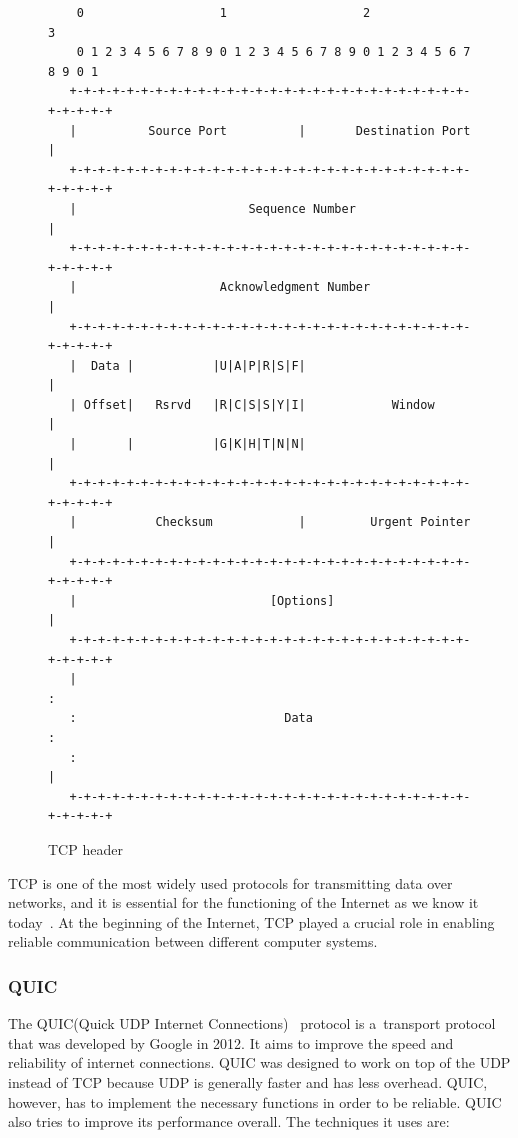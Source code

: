\documentclass[
  printed,     %
  color,       %
  oneside,     %
  nosansbold,  %
  nocolorbold, %
  nolof,         %
  nolot,         %
]{fithesis4}
\begin{document}
\begin{figure}[h]
\fontsize{10pt}{10pt}\selectfont
\begin{center}
\begin{BVerbatim}
    0                   1                   2                   3
    0 1 2 3 4 5 6 7 8 9 0 1 2 3 4 5 6 7 8 9 0 1 2 3 4 5 6 7 8 9 0 1
   +-+-+-+-+-+-+-+-+-+-+-+-+-+-+-+-+-+-+-+-+-+-+-+-+-+-+-+-+-+-+-+-+
   |          Source Port          |       Destination Port        |
   +-+-+-+-+-+-+-+-+-+-+-+-+-+-+-+-+-+-+-+-+-+-+-+-+-+-+-+-+-+-+-+-+
   |                        Sequence Number                        |
   +-+-+-+-+-+-+-+-+-+-+-+-+-+-+-+-+-+-+-+-+-+-+-+-+-+-+-+-+-+-+-+-+
   |                    Acknowledgment Number                      |
   +-+-+-+-+-+-+-+-+-+-+-+-+-+-+-+-+-+-+-+-+-+-+-+-+-+-+-+-+-+-+-+-+
   |  Data |           |U|A|P|R|S|F|                               |
   | Offset|   Rsrvd   |R|C|S|S|Y|I|            Window             |
   |       |           |G|K|H|T|N|N|                               |
   +-+-+-+-+-+-+-+-+-+-+-+-+-+-+-+-+-+-+-+-+-+-+-+-+-+-+-+-+-+-+-+-+
   |           Checksum            |         Urgent Pointer        |
   +-+-+-+-+-+-+-+-+-+-+-+-+-+-+-+-+-+-+-+-+-+-+-+-+-+-+-+-+-+-+-+-+
   |                           [Options]                           |
   +-+-+-+-+-+-+-+-+-+-+-+-+-+-+-+-+-+-+-+-+-+-+-+-+-+-+-+-+-+-+-+-+
   |                                                               :
   :                             Data                              :
   :                                                               |
   +-+-+-+-+-+-+-+-+-+-+-+-+-+-+-+-+-+-+-+-+-+-+-+-+-+-+-+-+-+-+-+-+
\end{BVerbatim}
\end{center}
  \caption{TCP header~\cite{RFC0793}}
  \label{fig:tcp}
\end{figure}

TCP is one of the most widely used protocols for transmitting data over networks, and it is essential for the functioning of the Internet as we know it today~\cite{10.5555/2584507}. At the beginning of the Internet, TCP played a crucial role in enabling reliable communication between different computer systems.

\subsubsection{QUIC}

The QUIC(Quick UDP Internet Connections)~\cite{RFC9000} protocol is a~transport protocol that was developed by Google in 2012. It aims to improve the speed and reliability of internet connections. QUIC was designed to work on top of the UDP instead of TCP because UDP is generally faster and has less overhead. QUIC, however, has to implement the necessary functions in order to be reliable. QUIC also tries to improve its performance overall. The techniques it uses are:
\end{document}
